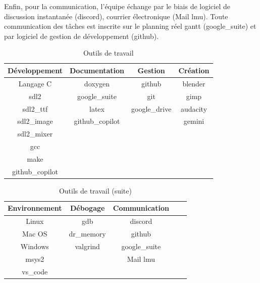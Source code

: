 \documentclass[11pt, a4paper]{article}
\begin{document}
    Enfin, pour la communication, l'équipe échange par le biais de logiciel de discussion instantanée (\Gls{discord}\cite{bib_discord}), courrier électronique (Mail \acrlong{lmu}). Toute communication des tâches est inscrite sur le planning réel \Gls{gantt} (\Gls{google_suite}) et par logiciel de gestion de développement (\Gls{github}).
            \begin{table}[h!]
            \centering
            \begin{tabular}{|c|c|c|c|}
                \hline
                Développement        & Documentation        & Gestion             & Création       \\
                \hline
                Langage C            & \Gls{doxygen}        & \Gls{github}        & \Gls{blender}  \\
                \Gls{sdl2}           & \Gls{google_suite}   & \Gls{git}           & \Gls{gimp}     \\
                \Gls{sdl2_ttf}       & \Gls{latex}          & \Gls{google_drive}  & \Gls{audacity} \\
                \Gls{sdl2_image}     & \Gls{github_copilot} &                     & \Gls{gemini}   \\
                \Gls{sdl2_mixer}     &                      &                     &                \\
                \Gls{gcc}            &                      &                     &                \\
                \Gls{make}           &                      &                     &                \\
                \Gls{github_copilot} &                      &                     &                \\
                \hline
            \end{tabular}
            \caption{Outils de travail}
            \label{tab:outils1}
        \end{table}

        \begin{table}[h!]
            \centering
            \begin{tabular}{|c|c|c|c|c|}
                \hline
                Environnement   & Débogage          & Communication       \\
                \hline
                Linux           & \Gls{gdb}         & \Gls{discord}             \\
                Mac OS          & \Gls{dr_memory}   & \Gls{github}              \\
                Windows         & \Gls{valgrind}    & \Gls{google_suite}         \\
                \Gls{msys2}     &                   & Mail \acrshort{lmu} \\
                \Gls{vs_code}   &                   &                     \\
                \hline
            \end{tabular}
            \caption{Outils de travail (suite)}
            \label{tab:outils2}
        \end{table}
\end{document}
